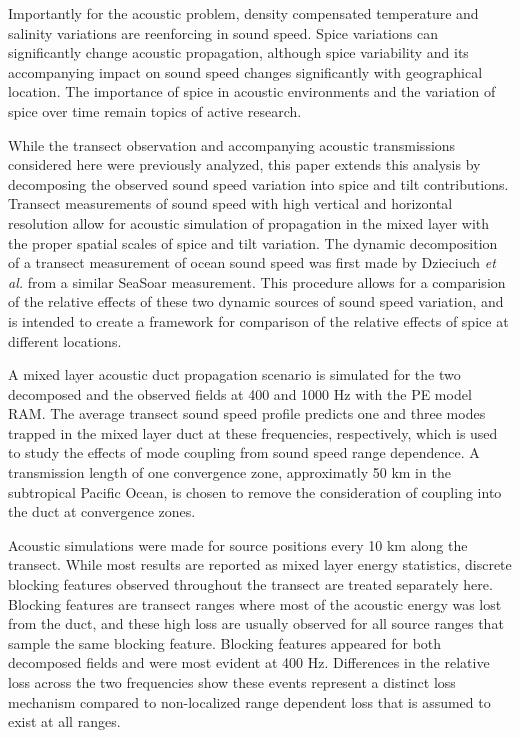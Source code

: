 \documentclass[preprint,NumberedRefs]{JASA}
\begin{document}
Importantly for the acoustic problem, density compensated temperature and salinity variations are reenforcing in sound speed. Spice variations can significantly change acoustic propagation, although spice variability and its accompanying impact on sound speed changes significantly with geographical location\citep{colosi12,colosi13,murat2021}. The importance of spice in acoustic environments and the variation of spice over time remain topics of active research.

While the transect observation and accompanying acoustic transmissions considered here were previously analyzed\citep{colosi2020observations}, this paper extends this analysis by decomposing the observed sound speed variation into spice and tilt contributions. Transect measurements of sound speed with high vertical and horizontal resolution allow for acoustic simulation of propagation in the mixed layer with the proper spatial scales of spice and tilt variation. The dynamic decomposition of a transect measurement of ocean sound speed was first made by Dzieciuch \emph{et al.}\citep{dzieciuch2004} from a similar SeaSoar measurement. This procedure allows for a comparision of the relative effects of these two dynamic sources of sound speed variation, and is intended to create a framework for comparison of the relative effects of spice at different locations.

A mixed layer acoustic duct propagation scenario is simulated for the two decomposed and the observed fields at 400 and 1000 Hz with the PE model RAM\cite{collins93}. The average transect sound speed profile predicts one and three modes trapped in the mixed layer duct at these frequencies, respectively, which is used to study the effects of mode coupling from sound speed range dependence. A transmission length of one convergence zone\citep{jensen2011computational}, approximatly 50 km in the subtropical Pacific Ocean, is chosen to remove the consideration of coupling into the duct at convergence zones\citep{colosi2020observations}.

Acoustic simulations were made for source positions every 10 km along the transect. While most results are reported as mixed layer energy statistics, discrete blocking features\citep{colosi2020observations} observed throughout the transect are treated separately here. Blocking features are transect ranges where most of the acoustic energy was lost from the duct, and these high loss are usually observed for all source ranges that sample the same blocking feature. Blocking features appeared for both decomposed fields and were most evident at 400 Hz. Differences in the relative loss across the two frequencies show these events represent a distinct loss mechanism compared to non-localized range dependent loss that is assumed to exist at all ranges.
\end{document}
